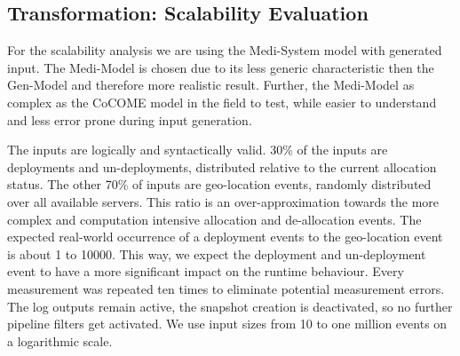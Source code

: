 \subsection{Transformation: Scalability Evaluation}

For the scalability analysis we are using the Medi-System model with generated input. The Medi-Model is chosen due to its less generic characteristic then the Gen-Model and therefore more realistic result. Further, the Medi-Model as complex as the CoCOME model in the field to test, while easier to understand and less error prone during input generation.

The inputs are logically and syntactically valid. 30\% of the inputs are deployments and un-deployments, distributed relative to the current allocation status. The other 70\% of inputs are geo-location events, randomly distributed over all available servers. This ratio is an over-approximation towards the more complex and computation intensive allocation and de-allocation events. The expected real-world occurrence of a deployment events to the geo-location event is about 1 to 10000. This way, we expect the deployment and un-deployment event to have a more significant impact on the runtime behaviour. Every measurement was repeated ten times to eliminate potential measurement errors. The log outputs remain active, the snapshot creation is deactivated, so no further pipeline filters get activated. We use input sizes from 10 to one million events on a logarithmic scale.

